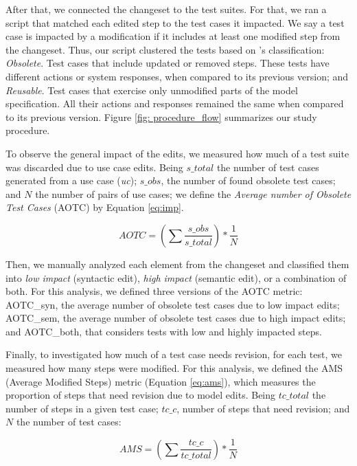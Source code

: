 After that, we connected the changeset to the test suites. For that, we ran a script that matched each edited step to the test cases it impacted. We say a test case is impacted by a modification if it includes at least one modified step from the changeset. Thus, our script clustered the tests based on \citet{de2016full}'s classification:
\textit{Obsolete}. Test cases that include updated or removed steps. These tests have different actions or system responses, when compared to its previous version; and \textit{Reusable}. Test cases that exercise only unmodified parts of the model specification. All their actions and responses remained the same when compared to its previous version. Figure \ref{fig: procedure_flow} summarizes our study procedure.

To observe the general impact of the edits, we measured how much of a test suite was discarded due to use case edits. Being $s\_total$ the number of test cases generated from a use case (\textit{uc}); $s\_obs$, the number of found obsolete test cases; and $N$ the number of pairs of use cases; we define the \textit{Average number of Obsolete Test Cases} (AOTC) by Equation \ref{eq:imp}. 

\begin{equation} \label{eq:imp}
AOTC = (\sum \frac{s\_obs}{s\_total}) * \frac{1}{N}
\end{equation}

Then, we manually analyzed each element from the changeset and classified them into \textit{low impact} (syntactic edit), \textit{high impact} (semantic edit), or a combination of both. For this analysis, we defined three versions of the AOTC metric: AOTC\_syn, the average number of obsolete test cases due to low impact edits; AOTC\_sem, the average number of obsolete test cases due to high impact edits; and AOTC\_both, that considers tests with low and highly impacted steps.

Finally, to investigated how much of a test case needs revision, for each test, we measured how many steps were modified. For this analysis, we defined the AMS (Average Modified Steps) metric (Equation \ref{eq:ams}), which measures the proportion of steps that need revision due to model edits. Being $tc\_total$ the number of steps in a given test case; $tc\_c$, number of steps that need revision; and $N$ the number of test cases: 

\begin{equation} \label{eq:ams}
AMS = (\sum \frac{tc\_c}{tc\_total}) * \frac{1}{N}
\end{equation}

